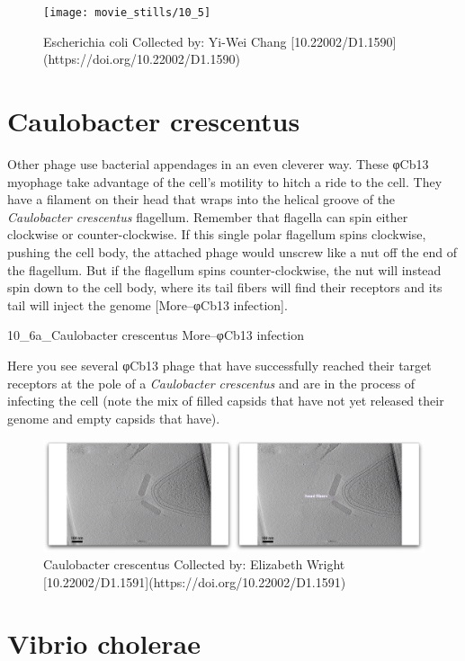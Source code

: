 \documentclass[]{tufte-book}
\begin{document}
\begin{figure}
\texttt{[image: movie\_stills/10\_5]} \caption[Escherichia coli Collected by]{Escherichia coli Collected by: Yi-Wei Chang [10.22002/D1.1590](https://doi.org/10.22002/D1.1590)}\label{fig:unnamed-chunk-177}
\end{figure}

\section{Caulobacter crescentus}\label{caulobacter-crescentus}

Other phage use bacterial appendages in an even cleverer way. These
φCb13 myophage take advantage of the cell's motility to hitch a ride to
the cell. They have a filament on their head that wraps into the helical
groove of the \emph{Caulobacter crescentus} flagellum. Remember that
flagella can spin either clockwise or counter-clockwise. If this single
polar flagellum spins clockwise, pushing the cell body, the attached
phage would unscrew like a nut off the end of the flagellum. But if the
flagellum spins counter-clockwise, the nut will instead spin down to the
cell body, where its tail fibers will find their receptors and its tail
will inject the genome {[}More--φCb13 infection{]}.

10\_6a\_Caulobacter crescentus More--φCb13 infection

Here you see several φCb13 phage that have successfully reached their
target receptors at the pole of a \emph{Caulobacter crescentus} and are
in the process of infecting the cell (note the mix of filled capsids
that have not yet released their genome and empty capsids that have).

\begin{figure}
\includegraphics{movie_stills/10_6} \caption[Caulobacter crescentus Collected by]{Caulobacter crescentus Collected by: Elizabeth Wright [10.22002/D1.1591](https://doi.org/10.22002/D1.1591)}\label{fig:unnamed-chunk-178}
\end{figure}

\section{Vibrio cholerae}\label{vibrio-cholerae-1}
\end{document}
